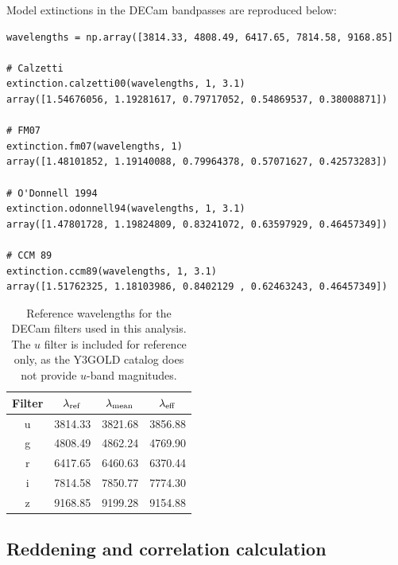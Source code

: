 \documentclass[11pt, oneside]{article}   	%
\begin{document}
Model extinctions in the DECam bandpasses are reproduced below: 
\small
\begin{verbatim}
wavelengths = np.array([3814.33, 4808.49, 6417.65, 7814.58, 9168.85]

# Calzetti 
extinction.calzetti00(wavelengths, 1, 3.1)
array([1.54676056, 1.19281617, 0.79717052, 0.54869537, 0.38008871])

# FM07
extinction.fm07(wavelengths, 1)
array([1.48101852, 1.19140088, 0.79964378, 0.57071627, 0.42573283])

# O'Donnell 1994
extinction.odonnell94(wavelengths, 1, 3.1)
array([1.47801728, 1.19824809, 0.83241072, 0.63597929, 0.46457349])

# CCM 89
extinction.ccm89(wavelengths, 1, 3.1)
array([1.51762325, 1.18103986, 0.8402129 , 0.62463243, 0.46457349])
\end{verbatim}

\normalsize

\begin{table}
    \centering
    \begin{tabular}{|c|c|c|c|}
        \hline
        Filter & $\lambda_{\rm ref}$ & $\lambda_{\rm mean}$ & $\lambda_{\rm eff}$ \\
        \hline
        u & 3814.33 & 3821.68 & 3856.88 \\
        \hline
        g & 4808.49 & 4862.24 & 4769.90 \\
        \hline
        r & 6417.65 & 6460.63 & 6370.44 \\
        \hline
        i & 7814.58 & 7850.77 & 7774.30 \\
        \hline
        z & 9168.85 & 9199.28 & 9154.88 \\
        \hline
    \end{tabular}
    \caption{Reference wavelengths for the DECam filters used in this analysis. The $u$ filter is included for reference only, as the Y3GOLD catalog does not provide $u$-band magnitudes.}
    \label{tab:filters}
\end{table}

\subsection{Reddening and correlation calculation}
\end{document}
